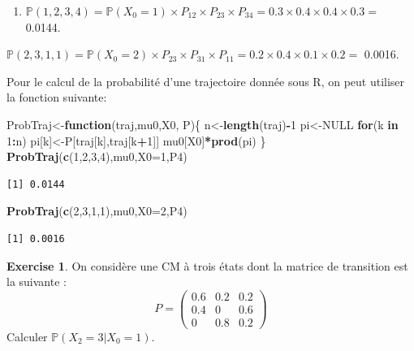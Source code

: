 \documentclass[
]{book}
\newenvironment{Shaded}{\begin{snugshade}}{\end{snugshade}}
\newcommand{\ControlFlowTok}[1]{\textcolor[rgb]{0.13,0.29,0.53}{\textbf{#1}}}
\newcommand{\DataTypeTok}[1]{\textcolor[rgb]{0.13,0.29,0.53}{#1}}
\newcommand{\DecValTok}[1]{\textcolor[rgb]{0.00,0.00,0.81}{#1}}
\newcommand{\KeywordTok}[1]{\textcolor[rgb]{0.13,0.29,0.53}{\textbf{#1}}}
\newcommand{\NormalTok}[1]{#1}
\newcommand{\OperatorTok}[1]{\textcolor[rgb]{0.81,0.36,0.00}{\textbf{#1}}}
\newcommand{\OtherTok}[1]{\textcolor[rgb]{0.56,0.35,0.01}{#1}}
\providecommand{\tightlist}{%
  \setlength{\itemsep}{0pt}\setlength{\parskip}{0pt}}
\theoremstyle{definition}
\theoremstyle{definition}
\theoremstyle{definition}
\newtheorem{exercise}{Exercise}[chapter]
\theoremstyle{remark}
\begin{document}
\begin{enumerate}
\def\labelenumi{\arabic{enumi}.}
\setcounter{enumi}{1}
\tightlist
\item
  \(\mathbb{P}(1,2,3,4)=\mathbb{P}(X_0=1)\times P_{12}\times P_{23}\times P_{34}= 0.3 \times 0.4 \times 0.4 \times 0.3 =\) 0.0144.
\end{enumerate}

\(\mathbb{P}(2,3,1,1)=\mathbb{P}(X_0=2)\times P_{23}\times P_{31}\times P_{11}= 0.2 \times 0.4 \times 0.1 \times 0.2 =\) 0.0016.

Pour le calcul de la probabilité d'une trajectoire donnée sous R, on peut utiliser la fonction suivante:

\begin{Shaded}
\begin{Highlighting}[]
\NormalTok{ProbTraj<-}\ControlFlowTok{function}\NormalTok{(traj,mu0,X0, P)\{}
\NormalTok{  n<-}\KeywordTok{length}\NormalTok{(traj)}\OperatorTok{-}\DecValTok{1}
\NormalTok{  pi<-}\OtherTok{NULL}
  \ControlFlowTok{for}\NormalTok{(k }\ControlFlowTok{in} \DecValTok{1}\OperatorTok{:}\NormalTok{n) pi[k]<-P[traj[k],traj[k}\OperatorTok{+}\DecValTok{1}\NormalTok{]]}
\NormalTok{mu0[X0]}\OperatorTok{*}\KeywordTok{prod}\NormalTok{(pi)}
\NormalTok{\}}
\KeywordTok{ProbTraj}\NormalTok{(}\KeywordTok{c}\NormalTok{(}\DecValTok{1}\NormalTok{,}\DecValTok{2}\NormalTok{,}\DecValTok{3}\NormalTok{,}\DecValTok{4}\NormalTok{),mu0,}\DataTypeTok{X0=}\DecValTok{1}\NormalTok{,P4)}
\end{Highlighting}
\end{Shaded}

\begin{verbatim}
[1] 0.0144
\end{verbatim}

\begin{Shaded}
\begin{Highlighting}[]
\KeywordTok{ProbTraj}\NormalTok{(}\KeywordTok{c}\NormalTok{(}\DecValTok{2}\NormalTok{,}\DecValTok{3}\NormalTok{,}\DecValTok{1}\NormalTok{,}\DecValTok{1}\NormalTok{),mu0,}\DataTypeTok{X0=}\DecValTok{2}\NormalTok{,P4)}
\end{Highlighting}
\end{Shaded}

\begin{verbatim}
[1] 0.0016
\end{verbatim}

\begin{exercise}
\protect\hypertarget{exr:unnamed-chunk-22}{}{\label{exr:unnamed-chunk-22} } On considère une CM à trois états dont la matrice de transition est la suivante :
\[ P=\left( 
  \begin{array}{ccc}
0.6 & 0.2 & 0.2 \\
0.4 & 0 & 0.6 \\
0 & 0.8 & 0.2
\end{array}
\right)\]
Calculer \(\mathbb{P}(X_2=3|X_0=1)\).
\end{exercise}
\end{document}
